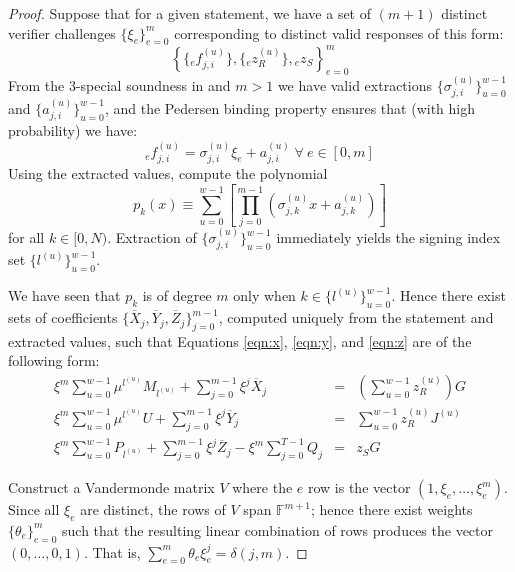 \documentclass{article}
\newcommand{\F}{\mathbb{F}}
\newcommand{\sumj}{\sum_{j=0}^{m-1}}
\newcommand{\sumu}{\sum_{u=0}^{w-1}}
\theoremstyle{definition}
\begin{document}
\begin{proof}
Suppose that for a given statement, we have a set of $(m+1)$ distinct verifier challenges $\{\xi_e\}_{e=0}^m$ corresponding to distinct valid responses of this form:
$$\left\{ \{{}_ef^{(u)}_{j,i}\}, \{{}_ez^{(u)}_R\}, {}_ez_S \right\}_{e=0}^m$$
From the $3$-special soundness in \cite{bootle} and $m > 1$ we have valid extractions $\{\sigma^{(u)}_{j,i}\}_{u=0}^{w-1}$ and $\{a^{(u)}_{j,i}\}_{u=0}^{w-1}$, and the Pedersen binding property ensures that (with high probability) we have:
$${}_ef^{(u)}_{j,i} = \sigma^{(u)}_{j,i}\xi_e + a^{(u)}_{j,i} \; \forall \: e \in [0,m]$$
Using the extracted values, compute the polynomial
$$p_k(x) \equiv \sum_{u=0}^{w-1}\left[ \prod_{j=0}^{m-1} \left( \sigma^{(u)}_{j,k}x + a^{(u)}_{j,k} \right) \right]$$
for all $k \in [0,N)$.
Extraction of $\{\sigma^{(u)}_{j,i}\}_{u=0}^{w-1}$ immediately yields the signing index set $\{l^{(u)}\}_{u=0}^{w-1}$.

We have seen that $p_k$ is of degree $m$ only when $k \in \{l^{(u)}\}_{u=0}^{w-1}$.
Hence there exist sets of coefficients $\{\overline{X}_j,\overline{Y}_j,\overline{Z}_j\}_{j=0}^{m-1}$, computed uniquely from the statement and extracted values, such that Equations \ref{eqn:x}, \ref{eqn:y}, and \ref{eqn:z} are of the following form:
\begin{eqnarray*}
\xi^m \sumu \mu^{l^{(u)}}M_{l^{(u)}} + \sumj \xi^j\overline{X}_j &=& \left( \sumu z^{(u)}_R \right)G \\
\xi^m \sumu \mu^{l^{(u)}}U + \sumj \xi^j\overline{Y}_j &=& \sumu z^{(u)}_RJ^{(u)} \\
\xi^m \sumu P_{l^{(u)}} + \sumj \xi^j\overline{Z}_j - \xi^m \sum_{j=0}^{T-1} Q_j &=& z_SG
\end{eqnarray*}

Construct a Vandermonde matrix $V$ where the $e$ row is the vector $(1,\xi_e,\ldots,\xi^m_e)$.
Since all $\xi_e$ are distinct, the rows of $V$ span $\F^{m+1}$; hence there exist weights $\{\theta_e\}_{e=0}^m$ such that the resulting linear combination of rows produces the vector $(0,\ldots,0,1)$.
That is, $\sum_{e=0}^m \theta_e\xi_e^j = \delta(j,m)$.


\end{proof}
\end{document}
